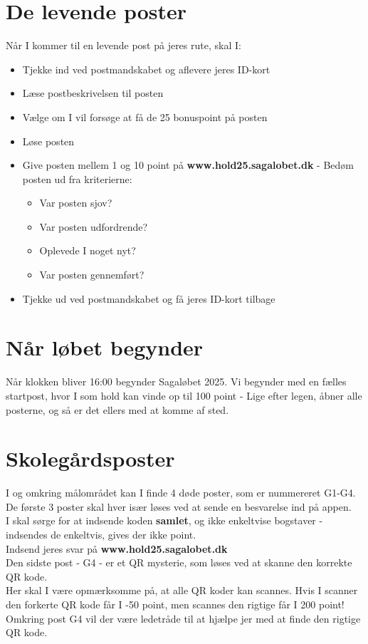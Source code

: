 \section{De levende poster}
Når I kommer til en levende post på jeres rute, skal I:
\begin{itemize}
    \item Tjekke ind ved postmandskabet og aflevere jeres ID-kort
    \item Læse postbeskrivelsen til posten
    \item Vælge om I vil forsøge at få de 25 bonuspoint på posten
    \item Løse posten
    \item Give posten mellem 1 og 10 point på \textbf{www.hold25.sagalobet.dk} - Bedøm posten ud fra kriterierne:
    \begin{itemize}
        \item Var posten sjov?
        \item Var posten udfordrende?
        \item Oplevede I noget nyt?
        \item Var posten gennemført?
        \end{itemize}
    \item Tjekke ud ved postmandskabet og få jeres ID-kort tilbage
\end{itemize}
\section{Når løbet begynder}
Når klokken bliver 16:00 begynder Sagaløbet 2025. Vi begynder med en fælles startpost, hvor I som hold kan vinde op til 100 point - Lige efter legen, åbner alle posterne, og så er det ellers med at komme af sted.
\section{Skolegårdsposter}
I og omkring målområdet kan I finde 4 døde poster, som er nummereret G1-G4.\\
De første 3 poster skal hver især løses ved at sende en besvarelse ind på appen.\\
I skal sørge for at indsende koden \textbf{samlet}, og ikke enkeltvise bogstaver - indsendes de enkeltvis, gives der ikke point.\\
\newline
Indsend jeres svar på \textbf{www.hold25.sagalobet.dk}\\
\newline
Den sidste post - G4 - er et QR mysterie, som løses ved at skanne den korrekte QR kode.\\
Her skal I være opmærksomme på, at alle QR koder kan scannes. Hvis I scanner den forkerte QR kode får I -50 point, men scannes den rigtige får I 200 point!\\
Omkring post G4 vil der være ledetråde til at hjælpe jer med at finde den rigtige QR kode.
